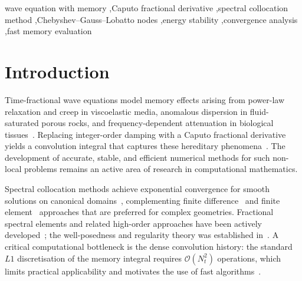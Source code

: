 \documentclass[a4paper,fleqn]{cas-sc}
\begin{document}
\begin{keywords}
wave equation with memory \sep Caputo fractional derivative \sep spectral collocation method \sep Chebyshev--Gauss--Lobatto nodes \sep energy stability \sep convergence analysis \sep fast memory evaluation
\end{keywords}

\maketitle

\section{Introduction}
Time-fractional wave equations model memory effects arising from power-law relaxation and creep in viscoelastic media, anomalous dispersion in fluid-saturated porous rocks, and frequency-dependent attenuation in biological tissues~\cite{ref13,ref14,ref17,ref18}. Replacing integer-order damping with a Caputo fractional derivative yields a convolution integral that captures these hereditary phenomena~\cite{ref19,ref20}. The development of accurate, stable, and efficient numerical methods for such non-local problems remains an active area of research in computational mathematics.

Spectral collocation methods achieve exponential convergence for smooth solutions on canonical domains~\cite{ref5,gottlieb1977}, complementing finite difference~\cite{ref1,ref3,ref9} and finite element~\cite{ref2,mustapha2015} approaches that are preferred for complex geometries. Fractional spectral elements and related high-order approaches have been actively developed~\cite{zayernouri2014, shiyapov2026high}; the well-posedness and regularity theory was established in~\cite{sakamoto2011,mclean2010,bazhlekova2013}. A critical computational bottleneck is the dense convolution history: the standard $L1$ discretisation of the memory integral requires $\mathcal{O}(N_t^2)$ operations, which limits practical applicability and motivates the use of fast algorithms~\cite{ref6,baffet2017}.
\end{document}
